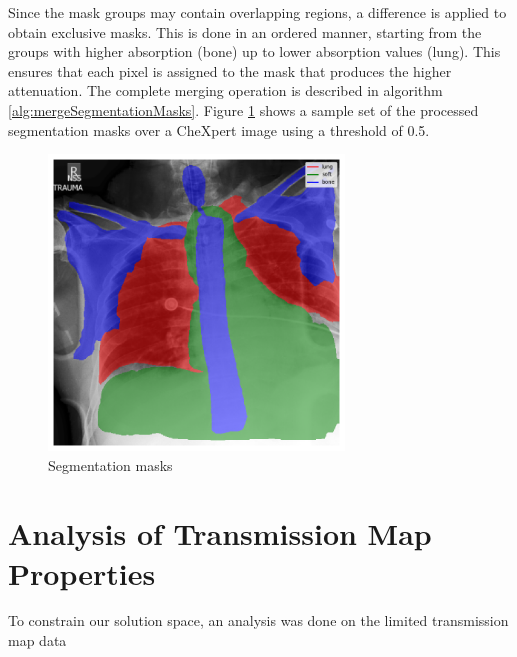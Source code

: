 \documentclass[nomenclature, english, bibtex]{kththesis}
\numberwithin{listing}{chapter}
\begin{document}
Since the mask groups may contain overlapping regions, a difference is applied to obtain exclusive masks. This is done in an ordered manner,
starting from the groups with higher absorption (bone) up to lower absorption values (lung). This ensures that each pixel is assigned to
the mask that produces the higher attenuation. The complete merging operation is described in algorithm \ref{alg:mergeSegmentationMasks}. Figure
\ref{fig:segmentationMasks} shows a sample set of the processed segmentation masks over a CheXpert image using a threshold of 0.5. 



\begin{figure}[H]
    \centering
    \includegraphics[width=0.7\textwidth]{figures/segmentation_masks.png}
    \caption{Segmentation masks}
    \label{fig:segmentationMasks}
\end{figure}

\section{Analysis of Transmission Map Properties}

To constrain our solution space, an analysis was done on the limited transmission map data
\end{document}
